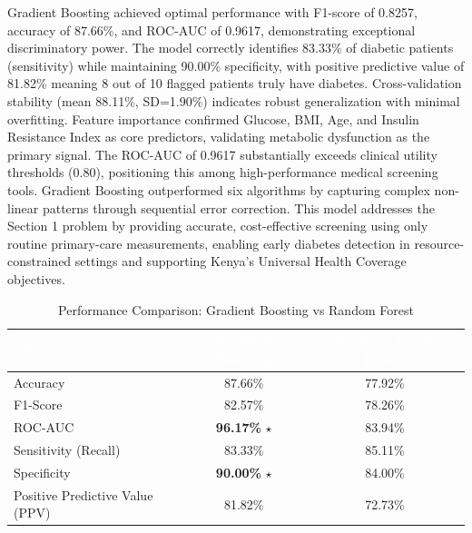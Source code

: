 \documentclass[12pt]{article}
\begin{document}
Gradient Boosting achieved optimal performance with F1-score of 0.8257, accuracy of 87.66\%, and ROC-AUC of 0.9617, demonstrating exceptional discriminatory power. The model correctly identifies 83.33\% of diabetic patients (sensitivity) while maintaining 90.00\% specificity, with positive predictive value of 81.82\% meaning 8 out of 10 flagged patients truly have diabetes. Cross-validation stability (mean 88.11\%, SD=1.90\%) indicates robust generalization with minimal overfitting. Feature importance confirmed Glucose, BMI, Age, and Insulin Resistance Index as core predictors, validating metabolic dysfunction as the primary signal. The ROC-AUC of 0.9617 substantially exceeds clinical utility thresholds (0.80), positioning this among high-performance medical screening tools. Gradient Boosting outperformed six algorithms by capturing complex non-linear patterns through sequential error correction. This model addresses the Section 1 problem by providing accurate, cost-effective screening using only routine primary-care measurements, enabling early diabetes detection in resource-constrained settings and supporting Kenya's Universal Health Coverage objectives.
\begin{table}[H]
\centering
\caption{Performance Comparison: Gradient Boosting vs Random Forest}
\label{tab:model_comparison}
\begin{tabular}{|l|c|c|}
\hline
\rowcolor{tableheader}
\textcolor{white}{\textbf{Metric}} & 
\textcolor{white}{\textbf{Gradient Boosting}} & 
\textcolor{white}{\textbf{Random Forest (Typical)}} \\ \hline
\rowcolor{tablerowlight} Accuracy & 87.66\% & 77.92\% \\ \hline
\rowcolor{tablerowwhite} F1-Score & 82.57\% & 78.26\% \\ \hline
\rowcolor{tablerowlight} ROC-AUC & \textbf{96.17\%} $\star$ & 83.94\% \\ \hline
\rowcolor{tablerowwhite} Sensitivity (Recall) & 83.33\% & 85.11\% \\ \hline
\rowcolor{tablerowlight} Specificity & \textbf{90.00\%} $\star$ & 84.00\% \\ \hline
\rowcolor{tablerowwhite} Positive Predictive Value (PPV) & 81.82\% & 72.73\% \\ \hline
\end{tabular}
\end{table}
\end{document}
